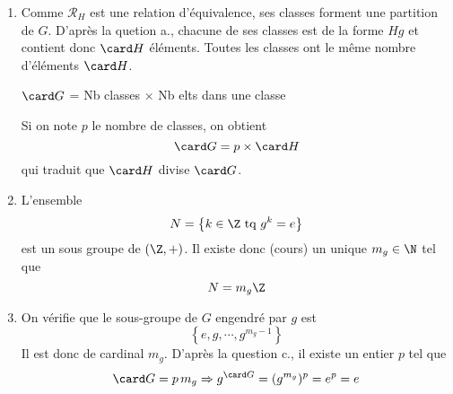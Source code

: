 \begin{enumerate}
  \item Comme $\mathcal{R}_H$ est une relation d'équivalence, ses classes forment une partition de $G$. D'après la quetion a., chacune de ses classes est de la forme $Hg$ et contient donc $\card H$ éléments. Toutes les classes ont le même nombre d'éléments $\card H$.
\begin{center}
$\card G$ = Nb classes $\times$ Nb elts dans une classe  
\end{center}
Si on note $p$ le nombre de classes, on obtient
\begin{displaymath}
  \card G = p\times \card H
\end{displaymath}
qui traduit que $\card H$ divise $\card G$.
  \item L'ensemble
\begin{displaymath}
  N = \left\lbrace k\in \Z \text{ tq } g^k = e\right\rbrace 
\end{displaymath}
est un sous groupe de $(\Z, +)$. Il existe donc (cours) un unique $m_g \in \N$ tel que 
\begin{displaymath}
  N = m_g \Z
\end{displaymath}

  \item On vérifie que le sous-groupe de $G$ engendré par $g$ est 
\begin{displaymath}
  \left\lbrace e, g, \cdots , g^{m_g -1}\right\rbrace 
\end{displaymath}
Il est donc de cardinal $m_g$. D'après la question c., il existe un entier $p$ tel que 
\begin{displaymath}
\card G = p\,m_g \Rightarrow g^{\card G} = (g^{m_g})^{p} = e^p = e  
\end{displaymath}

\end{enumerate}

